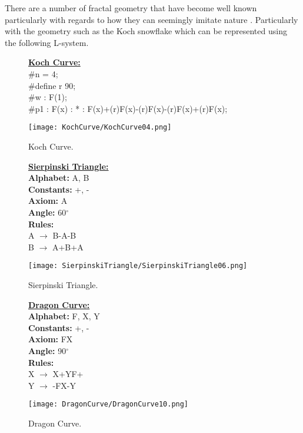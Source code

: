 There are a number of fractal geometry that have become well known particularly with regards to how they can seemingly imitate nature \cite{mandelbrot1982fractal}. Particularly with the geometry such as the Koch snowflake which can be represented using the following L-system.

\begin{figure}[htbp]
	\raggedright
	\textbf{\underline{Koch Curve:}} \\
	\#n = 4; \\
	\#define r 90; \\
	\#w : F(1); \\
	\#p1 : F(x) : * : F(x)+(r)F(x)-(r)F(x)-(r)F(x)+(r)F(x);\\
	{\centering
		\vspace{7px}
		\texttt{[image: KochCurve/KochCurve04.png]}
		\caption{Koch Curve.}
	}
\end{figure}
\begin{figure}[htbp]
	\raggedright
	\textbf{\underline{Sierpinski Triangle:}} \\
	\textbf{Alphabet:} A, B \\
	\textbf{Constants:} +, - \\
	\textbf{Axiom:} A \\
	\textbf{Angle:} 60$^\circ$ \\
	\textbf{Rules:} \\
	A $\rightarrow$  B-A-B \\
	B $\rightarrow$ A+B+A\\
	{\centering
		\vspace{7px}
		\texttt{[image: SierpinskiTriangle/SierpinskiTriangle06.png]}
		\caption{Sierpinski Triangle.}
	}
\end{figure}
\begin{figure}[htbp]
	\raggedright
	\textbf{\underline{Dragon Curve:}} \\
	\textbf{Alphabet:} F, X, Y \\
	\textbf{Constants:} +, - \\
	\textbf{Axiom:} FX \\
	\textbf{Angle:} 90$^\circ$ \\
	\textbf{Rules:} \\
	X $\rightarrow$ X+YF+ \\
	Y $\rightarrow$ -FX-Y\\
	{\centering
		\vspace{7px}
		\texttt{[image: DragonCurve/DragonCurve10.png]}
		\caption{Dragon Curve.}
	}
\end{figure}
